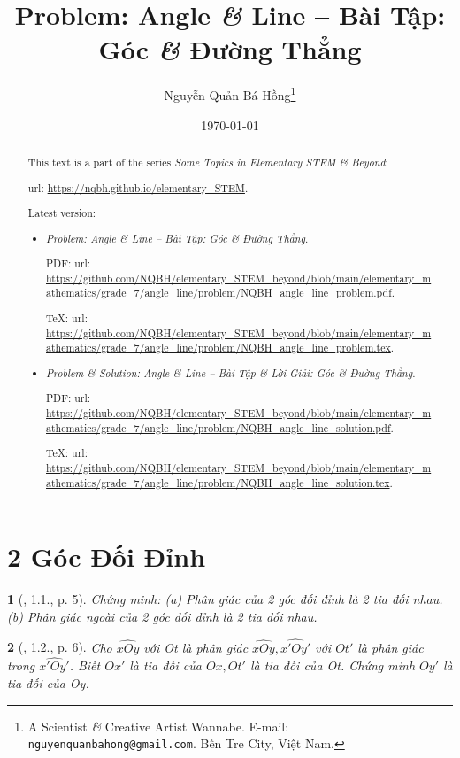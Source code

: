 \documentclass{article}
\title{Problem: Angle {\it\&} Line -- Bài Tập: Góc {\it\&} Đường Thẳng}
\author{Nguyễn Quản Bá Hồng\footnote{A Scientist {\it\&} Creative Artist Wannabe. E-mail: {\tt nguyenquanbahong@gmail.com}. Bến Tre City, Việt Nam.}}
\date{\today}
\newtheorem{baitoan}{}
\begin{document}
\maketitle
\begin{abstract}
	This text is a part of the series {\it Some Topics in Elementary STEM \& Beyond}:
	
	{\sc url}: \url{https://nqbh.github.io/elementary_STEM}.
	
	Latest version:
	\begin{itemize}
		\item {\it Problem: Angle \& Line -- Bài Tập: Góc {\it\&} Đường Thẳng}.
		
		PDF: {\sc url}: \url{https://github.com/NQBH/elementary_STEM_beyond/blob/main/elementary_mathematics/grade_7/angle_line/problem/NQBH_angle_line_problem.pdf}.
		
		\TeX: {\sc url}: \url{https://github.com/NQBH/elementary_STEM_beyond/blob/main/elementary_mathematics/grade_7/angle_line/problem/NQBH_angle_line_problem.tex}.
		\item {\it Problem \& Solution: Angle {\it\&} Line -- Bài Tập \& Lời Giải: Góc \& Đường Thẳng}.
		
		PDF: {\sc url}: \url{https://github.com/NQBH/elementary_STEM_beyond/blob/main/elementary_mathematics/grade_7/angle_line/problem/NQBH_angle_line_solution.pdf}.
		
		\TeX: {\sc url}: \url{https://github.com/NQBH/elementary_STEM_beyond/blob/main/elementary_mathematics/grade_7/angle_line/problem/NQBH_angle_line_solution.tex}.
	\end{itemize}
\end{abstract}
\tableofcontents


\section{2 Góc Đối Đỉnh}

\begin{baitoan}[\cite{Hung_Mai_Toan_7_hinh_hoc}, 1.1., p. 5]
	Chứng minh: (a) Phân giác của 2 góc đối đỉnh là 2 tia đối nhau. (b) Phân giác ngoài của 2 góc đối đỉnh là 2 tia đối nhau.
\end{baitoan}

\begin{baitoan}[\cite{Hung_Mai_Toan_7_hinh_hoc}, 1.2., p. 6]
	Cho $\widehat{xOy}$ với Ot là phân giác $\widehat{xOy},\widehat{x'Oy'}$ với $Ot'$ là phân giác trong $\widehat{x'Oy'}$. Biết $Ox'$ là tia đối của $Ox,Ot'$ là tia đối của Ot. Chứng minh $Oy'$ là tia đối của Oy.
\end{baitoan}
\end{document}

